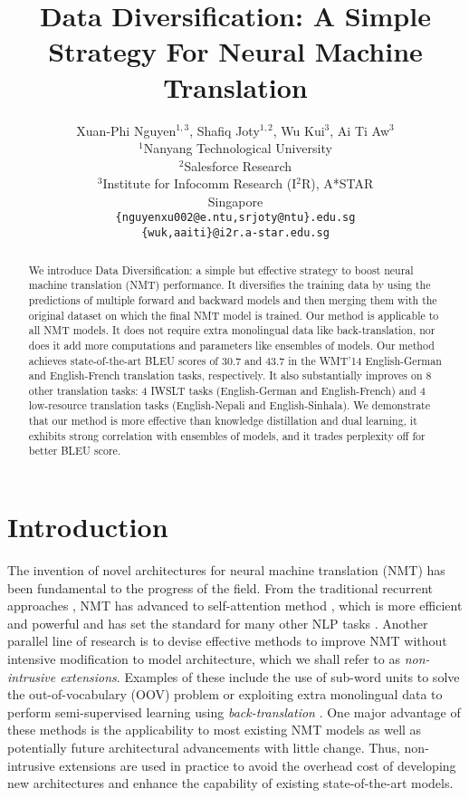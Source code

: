 \documentclass{article}
\title{Data Diversification: {A Simple Strategy For Neural Machine Translation}}
\author{Xuan-Phi Nguyen$^{1,3}$, Shafiq Joty$^{1,2}$, Wu Kui$^{3}$, Ai Ti Aw$^{3}$ \\
  $^1$Nanyang Technological University\\
  $^2$Salesforce Research\\
  $^3$Institute for Infocomm Research (I$^2$R), A*STAR \\
  Singapore \\
  \texttt{\{nguyenxu002@e.ntu,srjoty@ntu\}.edu.sg}\\
  \texttt{\{wuk,aaiti\}@i2r.a-star.edu.sg}
  }
\begin{document}
\maketitle
\begin{abstract}
We introduce Data Diversification: a simple but effective strategy to boost neural machine translation (NMT) performance. It diversifies the training data by using the predictions of multiple forward and backward models and then merging them with the original dataset on which the final NMT model is trained. Our method is applicable to all NMT models. It does not require extra monolingual data like back-translation, nor does it add more computations and parameters like ensembles of models. Our method achieves state-of-the-art BLEU scores of 30.7 and 43.7 in the WMT'14 English-German and English-French translation tasks, respectively. It also substantially improves on 8 other translation tasks: 4 IWSLT tasks (English-German and English-French) and 4 low-resource translation tasks (English-Nepali and English-Sinhala). We demonstrate that our method is more effective than knowledge distillation and dual learning, it exhibits strong correlation with ensembles of models, and it trades perplexity off for better BLEU score.
\end{abstract}

\section{Introduction} \label{sec:intro}
The invention of novel architectures for neural machine translation (NMT) has been fundamental to the progress of the field. From the traditional recurrent approaches \citep{SutskeverNIPS2014,luong2015effective}, NMT has advanced to self-attention method \citep{vaswani2017attention}, which is more efficient and powerful and has set the standard for many other NLP tasks \citep{devlin2018bert}. 
Another parallel line of research is to devise effective methods to improve NMT without intensive modification to model architecture, which we shall refer to as \emph{non-intrusive extensions}. Examples of these include the use of sub-word units to solve the out-of-vocabulary (OOV) problem \citep{sennrich2015neural} or exploiting extra monolingual data to perform semi-supervised learning using \emph{back-translation} \citep{backtranslate_sennrich-etal-2016-improving,understanding_backtranslation_scale}. One major advantage of these methods is the applicability to most existing NMT models as well as potentially future architectural advancements with little change. Thus, non-intrusive extensions are used in practice to avoid the overhead cost of developing new architectures and enhance the capability of existing state-of-the-art models.  
\end{document}
